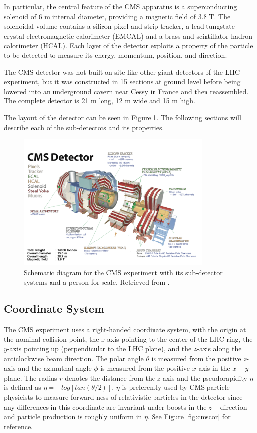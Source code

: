 In particular, the central feature of the CMS apparatus is a superconducting solenoid of 6 m internal diameter, providing a magnetic field of 3.8 T. The solenoidal volume contains a silicon pixel and strip tracker, a lead tungstate crystal electromagnetic calorimeter (EMCAL) and a brass and scintillator hadron calorimeter (HCAL). Each layer of the detector exploits a property of the particle to be detected to measure its energy, momentum, position, and direction. 

The CMS detector was not built on site like other giant detectors of the LHC experiment, but it was constructed in 15 sections at ground level before being lowered into an underground cavern near Cessy in France and then reassembled. The complete detector is 21 m long, 12 m wide and 15 m high.

The layout of the detector can be seen in Figure \ref{fig:cmsdia}. The following sections will describe each of the sub-detectors and its properties.

 \begin{figure}[H]
 	\centering
 	\includegraphics[width=0.85\textwidth]{figures/cms_whole.png}
 	\singlespace
 	\caption{Schematic diagram for the CMS experiment with its sub-detector systems and a person for scale. Retrieved from \cite{CMS-schematic}.}
 	\label{fig:cmsdia}
 \end{figure}

 \subsection{Coordinate System}

 The CMS experiment uses a right-handed coordinate system, with the origin at the nominal collision point, the $x$-axis pointing to the center of the LHC ring, the $y$-axis pointing up (perpendicular to the LHC plane), and the $z$-axis along the anticlockwise beam direction. The polar angle $\theta$ is measured from the positive $z$-axis and the azimuthal angle $\phi$ is measured from the positive $x$-axis in the $x-y$ plane. The radius $r$ denotes the distance from the $z$-axis and the pseudorapidity $\eta$ is defined as $\eta=-log[tan(\theta /2)]$. $\eta$ is preferently used by CMS particle physicists to measure forward-ness of relativistic particles in the detector since any differences in this coordinate are invariant under boosts in the $z-$direction and particle production is roughly uniform in $\eta$. See Figure \ref{fig:cmscor} for reference.

